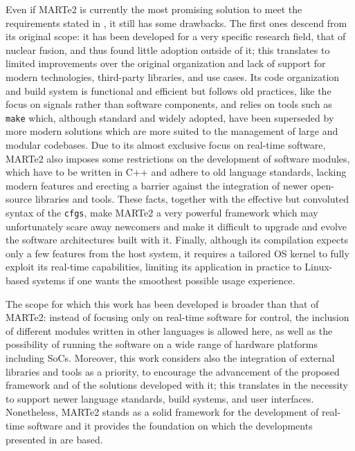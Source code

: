 Even if MARTe2 is currently the most promising solution to meet the requirements stated in , it still has some drawbacks. The first ones descend from its original scope: it has been developed for a very specific research field, that of nuclear fusion, and thus found little adoption outside of it; this translates to limited improvements over the original organization and lack of support for modern technologies, third-party libraries, and use cases. Its code organization and build system is functional and efficient but follows old practices, like the focus on signals rather than software components, and relies on tools such as \texttt{make} which, although standard and widely adopted, have been superseded by more modern solutions which are more suited to the management of large and modular codebases. Due to its almost exclusive focus on real-time software, MARTe2 also imposes some restrictions on the development of software modules, which have to be written in C++ and adhere to old language standards, lacking modern features and erecting a barrier against the integration of newer open-source libraries and tools. These facts, together with the effective but convoluted syntax of the \texttt{cfgs}, make MARTe2 a very powerful framework which may unfortunately scare away newcomers and make it difficult to upgrade and evolve the software architectures built with it. Finally, although its compilation expects only a few features from the host system, it requires a tailored OS kernel to fully exploit its real-time capabilities, limiting its application in practice to Linux-based systems if one wants the smoothest possible usage experience.

The scope for which this work has been developed is broader than that of MARTe2: instead of focusing only on real-time software for control, the inclusion of different modules written in other languages is allowed here, as well as the possibility of running the software on a wide range of hardware platforms including SoCs. Moreover, this work considers also the integration of external libraries and tools as a priority, to encourage the advancement of the proposed framework and of the solutions developed with it; this translates in the necessity to support newer language standards, build systems, and user interfaces. Nonetheless, MARTe2 stands as a solid framework for the development of real-time software and it provides the foundation on which the developments presented in  are based.

